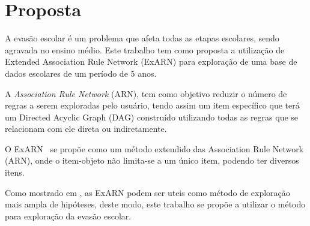 \chapter{Proposta}

A evasão escolar é um problema que afeta todas as etapas escolares, sendo agravada no ensino médio. Este trabalho tem como proposta a utilização de Extended Association Rule Network (ExARN) para exploração de uma base de dados escolares de um período de 5 anos.

A \textit{Association Rule Network} (ARN), tem como objetivo reduzir o número de regras a serem exploradas pelo usuário, tendo assim um item específico que terá um Directed Acyclic Graph (DAG) construído utilizando todas as regras que se relacionam com ele direta ou indiretamente.

O ExARN~ se propõe como um método extendido das Association Rule Network (ARN), onde o item-objeto não limita-se a um único item, podendo ter diversos itens.

Como mostrado em \cite{DBLP:conf/ismir/PaduaCRS18}, as ExARN podem ser uteis como método de exploração mais ampla de hipóteses, deste modo, este trabalho se propõe a utilizar o método para exploração da evasão escolar.